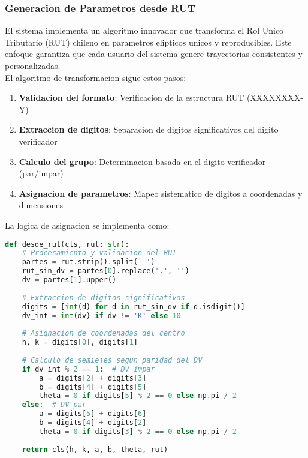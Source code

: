 \documentclass[12pt,a4paper]{article}
\begin{document}
\subsubsection{Generacion de Parametros desde RUT}

El sistema implementa un algoritmo innovador que transforma el Rol Unico Tributario (RUT) chileno en parametros elipticos unicos y reproducibles. Este enfoque garantiza que cada usuario del sistema genere trayectorias consistentes y personalizadas.\\

El algoritmo de transformacion sigue estos pasos:

\begin{enumerate}
    \item \textbf{Validacion del formato}: Verificacion de la estructura RUT (XXXXXXXX-Y)
    \item \textbf{Extraccion de digitos}: Separacion de digitos significativos del digito verificador
    \item \textbf{Calculo del grupo}: Determinacion basada en el digito verificador (par/impar)
    \item \textbf{Asignacion de parametros}: Mapeo sistematico de digitos a coordenadas y dimensiones
\end{enumerate}

La logica de asignacion se implementa como:

\begin{lstlisting}[language=Python, caption=Algoritmo de generacion de parametros elipticos]
def desde_rut(cls, rut: str):
    # Procesamiento y validacion del RUT
    partes = rut.strip().split('-')
    rut_sin_dv = partes[0].replace('.', '')
    dv = partes[1].upper()
    
    # Extraccion de digitos significativos
    digits = [int(d) for d in rut_sin_dv if d.isdigit()]
    dv_int = int(dv) if dv != 'K' else 10
    
    # Asignacion de coordenadas del centro
    h, k = digits[0], digits[1]
    
    # Calculo de semiejes segun paridad del DV
    if dv_int % 2 == 1:  # DV impar
        a = digits[2] + digits[3]
        b = digits[4] + digits[5]
        theta = 0 if digits[5] % 2 == 0 else np.pi / 2
    else:  # DV par
        a = digits[5] + digits[6]
        b = digits[4] + digits[2]
        theta = 0 if digits[3] % 2 == 0 else np.pi / 2
    
    return cls(h, k, a, b, theta, rut)
\end{lstlisting}
\end{document}
